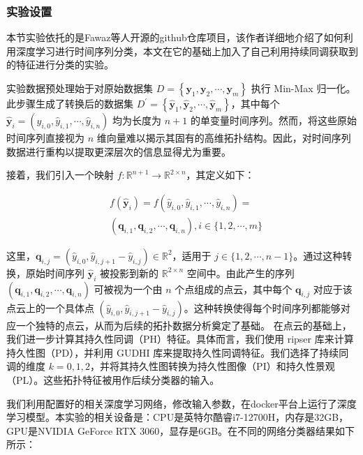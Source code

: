 \subsubsection{实验设置}
本节实验依托的是Fawaz等人\cite{ismail2019deep}开源的github仓库项目，该作者详细地介绍了如何利用深度学习进行时间序列分类，本文在它的基础上加入了自己利用持续同调获取到的特征进行分类的实验。

实验数据预处理始于对原始数据集 $D=\left\{\boldsymbol{y}_1, \boldsymbol{y}_2, \cdots, \boldsymbol{y}_m\right\}$ 执行 Min-Max 归一化。此步骤生成了转换后的数据集 $D^{\prime}=\left\{\hat{\boldsymbol{y}}_1, \hat{\boldsymbol{y}}_2, \cdots, \hat{\boldsymbol{y}}_m\right\}$，其中每个 $\hat{\boldsymbol{y}}_i=\left(\hat{y}_{i, 0}, \hat{y}_{i, 1}, \cdots, \hat{y}_{i, n}\right)$ 均为长度为 $n+1$ 的单变量时间序列。然而，将这些原始时间序列直接视为 $n$ 维向量难以揭示其固有的高维拓扑结构。因此，对时间序列数据进行重构以提取更深层次的信息显得尤为重要。

接着，我们引入一个映射 $f: \mathbb{R}^{n+1} \rightarrow \mathbb{R}^{2 \times n}$，其定义如下：

$$
    \begin{aligned}
         & f\left(\hat{\boldsymbol{y}}_i\right)=f\left(\hat{y}_{i, 0}, \hat{y}_{i, 1}, \cdots, \hat{y}_{i, n}\right)=        \\
         & \left(\boldsymbol{q}_{i, 1}, \boldsymbol{q}_{i, 2}, \cdots, \boldsymbol{q}_{i, n}\right), i \in\{1,2, \cdots, m\}
    \end{aligned}
$$

这里，$\boldsymbol{q}_{i, j}=\left(\hat{y}_{i, 0}, \hat{y}_{i, j+1}-\hat{y}_{i, j}\right) \in \mathbb{R}^2$，适用于 $j \in\{1,2, \cdots, n-1\}$。通过这种转换，原始时间序列 $\hat{\boldsymbol{y}}_i$ 被投影到新的 $\mathbb{R}^{2 \times n}$ 空间中。由此产生的序列 $\left(\boldsymbol{q}_{i, 1}, \boldsymbol{q}_{i, 2}, \cdots, \boldsymbol{q}_{i, n}\right)$ 可被视为一个由 $n$ 个点组成的点云，其中每个 $\boldsymbol{q}_{i, j}$ 对应于该点云上的一个具体点 $\left(\hat{y}_{i, 0}, \hat{y}_{i, j+1}-\hat{y}_{i, j}\right)$。这种转换使得每个时间序列都能够对应一个独特的点云，从而为后续的拓扑数据分析奠定了基础。
在点云的基础上，我们进一步计算其持久性同调（PH）特征。具体而言，我们使用 ripser 库来计算持久性图（PD），并利用 GUDHI 库来提取持久性同调特征。我们选择了持续同调的维度 $k=0,1,2$，并将其持久性图转换为持久性图像（PI）和持久性景观（PL）。这些拓扑特征被用作后续分类器的输入。

我们利用配置好的相关深度学习网络，修改输入参数，在docker平台上运行了深度学习模型。本实验的相关设备是：CPU是英特尔酷睿i7-12700H，内存是32GB，GPU是NVIDIA GeForce RTX 3060，显存是6GB。在不同的网络分类器结果如下所示：


